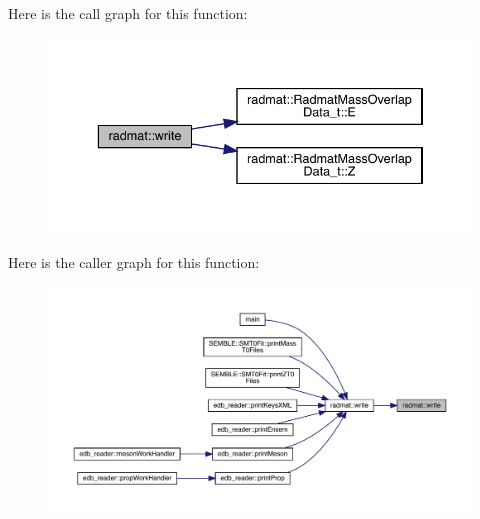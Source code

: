 Here is the call graph for this function\+:
\nopagebreak
\begin{figure}[H]
\begin{center}
\leavevmode
\includegraphics[width=336pt]{d4/d83/namespaceradmat_a47d088d360c723c8981b3ef1ed8da405_cgraph}
\end{center}
\end{figure}
Here is the caller graph for this function\+:
\nopagebreak
\begin{figure}[H]
\begin{center}
\leavevmode
\includegraphics[width=350pt]{d4/d83/namespaceradmat_a47d088d360c723c8981b3ef1ed8da405_icgraph}
\end{center}
\end{figure}

